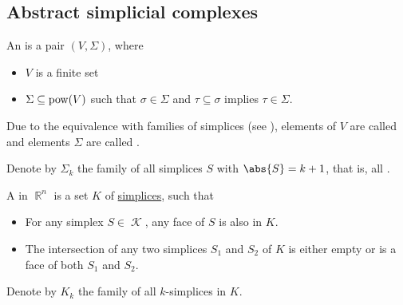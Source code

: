 \subsection{Abstract simplicial complexes}\label{subsec:abstract_simplicial_complexes}

\begin{definition}\label{def:abstract_simplicial_complex}
  An  is a pair \( (V, \Sigma) \), where
  \begin{itemize}
    \item \( V \) is a finite set
    \item \( \Sigma \subseteq \operatorname{pow}(V) \) such that \( \sigma \in \Sigma \) and \( \tau \subseteq \sigma \) implies \( \tau \in \Sigma \).
  \end{itemize}

  Due to the equivalence with families of simplices (see ), elements of \( V \) are called  and elements \( \Sigma \) are called .

  Denote by \( \Sigma_k \) the family of all simplices \( S \) with \( \abs{S} = k + 1 \), that is, all .
\end{definition}

\begin{definition}\label{def:simplicial_complex}
  A  in \( \BbbR^n \) is a set \( K \) of \hyperref[def:simplex]{simplices}, such that
  \begin{itemize}
    \item For any simplex \( S \in \mscrK \), any face of \( S \) is also in \( K \).
    \item The intersection of any two simplices \( S_1 \) and \( S_2 \) of \( K \) is either empty or is a face of both \( S_1 \) and \( S_2 \).
  \end{itemize}

  Denote by \( K_k \) the family of all \( k \)-simplices in \( K \).
\end{definition}

